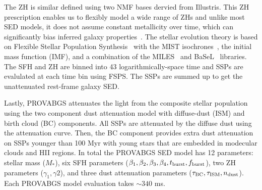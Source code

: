 The ZH is similar defined using two NMF bases dervied from Illustris. 
This ZH prescription enables us to flexibly model a wide range of ZHs and
unlike most SED models, it does not assume constant metallicity over time,
which can significantly bias inferred galaxy properties~\citep{thorne2021}. 
The stellar evolution theory is based on Flexible Stellar Population
Synthesis~\citep[FSPS;][]{conroy2009, conroy2010c} with the MIST
isochrones~\citep{paxton2011, paxton2013, paxton2015, choi2016, dotter2016},  
the \cite{chabrier2003} initial mass function (IMF), and a combination of the
MILES~\citep{sanchez-blazquez2006} and BaSeL~\citep{lejeune1997, lejeune1998,
westera2002} libraries.
The SFH and ZH are binned into 43 logarithmically-space time and SSPs are
evalulated at each time bin using FSPS. 
The SSPs are summed up to get the unattenuated rest-frame galaxy SED. 

Lastly, PROVABGS attenuates the light from the composite stellar population
using the two component \cite{charlot2000} dust attenuation model with
diffuse-dust (ISM) and birth cloud (BC) components. 
All SSPs are attenuated by the diffuse dust using the \cite{kriek2013}
attenuation curve.
Then, the BC component provides extra dust attenuation on SSPs younger than 100
Myr with young stars that are embedded in modecular clouds and HII regions. 
In total the PROVABGS SED model has 12 parameters: stellar mass ($M_*$),
six SFH parameters ($\beta_1, \beta_2, \beta_3, \beta_4, t_{\rm burst}, f_{\rm
burst}$), two ZH parameters ($\gamma_1, \gamma2$), and three dust attenuation
parameters ($\tau_{\rm BC}, \tau_{\rm ISM}, n_{\rm dust}$). 
Each PROVABGS model evaluation takes ${\sim}340$ ms. 


